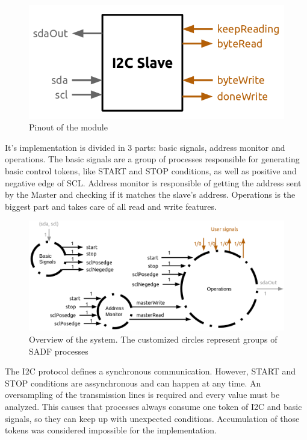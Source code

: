 \documentclass{article}
\begin{document}
\begin{figure}
  \includegraphics[width=\linewidth]{img/pinout.png}
  \caption{Pinout of the module}
  \label{fig:pinout}
\end{figure}

It's implementation is divided in 3 parts: basic signals, address monitor and operations. The basic signals are a group of processes responsible for generating basic control tokens, like START and STOP conditions, as well as positive and negative edge of SCL. Address monitor is responsible of getting the address sent by the Master and checking if it matches the slave's address. Operations is the biggest part and takes care of all read and write features.

\begin{figure}
  \includegraphics[width=\linewidth]{img/overview.png}
  \caption{Overview of the system. The customized circles represent groups of SADF processes}
  \label{fig:overview}
\end{figure}

The I2C protocol defines a synchronous communication. However, START and STOP conditions are assynchronous and can happen at any time. An oversampling of the transmission lines is required and every value must be analyzed. This causes that processes always consume one token of I2C and basic signals, so they can keep up with unexpected conditions. Accumulation of those tokens was considered impossible for the implementation.
\end{document}
